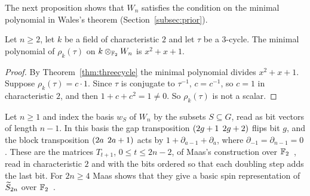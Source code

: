 The next proposition shows that $W_n$ satisfies the condition on the minimal polynomial in Wales's theorem (Section~\ref{subsec:prior}).

\begin{proposition}\label{prop:minpoly}
Let $n\ge2$, let $k$ be a field of characteristic $2$ and let $\tau$ be a $3$-cycle. The minimal polynomial of $\rho_k(\tau)$ on $k\otimes_{\mathbb{F}_2}W_n$ is $x^2+x+1$.
\end{proposition}

\begin{proof}
By Theorem~\ref{thm:threecycle} the minimal polynomial divides $x^2+x+1$. Suppose $\rho_k(\tau)=c\cdot1$. Since $\tau$ is conjugate to $\tau^{-1}$, $c=c^{-1}$, so $c=1$ in characteristic $2$, and then $1+c+c^2=1\ne0$. So $\rho_k(\tau)$ is not a scalar.
\end{proof}

\begin{proposition}\label{prop:maas}
Let $n\ge1$ and index the basis $w_S$ of $W_n$ by the subsets $S\subseteq G$, read as bit vectors of length $n-1$. In this basis the gap transposition $(2g+1\;\,2g+2)$ flips bit $g$, and the block transposition $(2a\;\,2a+1)$ acts by $1+\partial_{a-1}+\partial_a$, where $\partial_{-1}=\partial_{n-1}=0$. These are the matrices $T_{t+1}$, $0\le t\le2n-2$, of Maas's construction over $\mathbb{F}_2$~\cite[Table~1]{Maas10}, read in characteristic $2$ and with the bits ordered so that each doubling step adds the last bit. For $2n\ge4$ Maas shows that they give a basic spin representation of $\widetilde{S}_{2n}$ over $\mathbb{F}_2$~\cite[Cor.~13]{Maas10}.
\end{proposition}

